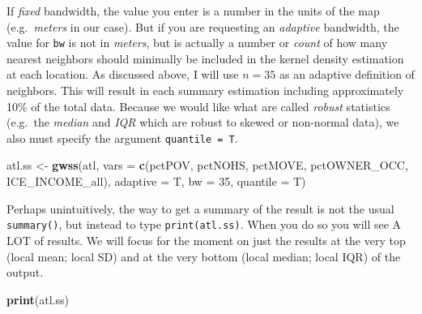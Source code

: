 \documentclass[
]{book}
\newenvironment{Shaded}{\begin{snugshade}}{\end{snugshade}}
\newcommand{\AttributeTok}[1]{\textcolor[rgb]{0.13,0.29,0.53}{#1}}
\newcommand{\DecValTok}[1]{\textcolor[rgb]{0.00,0.00,0.81}{#1}}
\newcommand{\FunctionTok}[1]{\textcolor[rgb]{0.13,0.29,0.53}{\textbf{#1}}}
\newcommand{\NormalTok}[1]{#1}
\newcommand{\OtherTok}[1]{\textcolor[rgb]{0.56,0.35,0.01}{#1}}
\newcommand{\StringTok}[1]{\textcolor[rgb]{0.31,0.60,0.02}{#1}}
\begin{document}
If \emph{fixed} bandwidth, the value you enter is a number in the units of the map (e.g.~\emph{meters} in our case). But if you are requesting an \emph{adaptive} bandwidth, the value for \texttt{bw} is not in \emph{meters}, but is actually a number or \emph{count} of how many nearest neighbors should minimally be included in the kernel density estimation at each location. As discussed above, I will use \(n=35\) as an adaptive definition of neighbors. This will result in each summary estimation including approximately 10\% of the total data. Because we would like what are called \emph{robust} statistics (e.g.~the \emph{median} and \emph{IQR} which are robust to skewed or non-normal data), we also must specify the argument \texttt{quantile\ =\ T}.

\begin{Shaded}
\begin{Highlighting}[]
\NormalTok{atl.ss }\OtherTok{\textless{}{-}} \FunctionTok{gwss}\NormalTok{(atl, }\AttributeTok{vars =} \FunctionTok{c}\NormalTok{(}\StringTok{\textquotesingle{}pctPOV\textquotesingle{}}\NormalTok{, }\StringTok{\textquotesingle{}pctNOHS\textquotesingle{}}\NormalTok{, }\StringTok{\textquotesingle{}pctMOVE\textquotesingle{}}\NormalTok{, }\StringTok{\textquotesingle{}pctOWNER\_OCC\textquotesingle{}}\NormalTok{,}
                             \StringTok{\textquotesingle{}ICE\_INCOME\_all\textquotesingle{}}\NormalTok{),}
               \AttributeTok{adaptive =}\NormalTok{ T,}
               \AttributeTok{bw =} \DecValTok{35}\NormalTok{,}
               \AttributeTok{quantile =}\NormalTok{ T)}
\end{Highlighting}
\end{Shaded}

Perhaps unintuitively, the way to get a summary of the result is not the usual \texttt{summary()}, but instead to type \texttt{print(atl.ss)}. When you do so you will see A LOT of results. We will focus for the moment on just the results at the very top (local mean; local SD) and at the very bottom (local median; local IQR) of the output.

\begin{Shaded}
\begin{Highlighting}[]
\FunctionTok{print}\NormalTok{(atl.ss)}
\end{Highlighting}
\end{Shaded}
\end{document}
